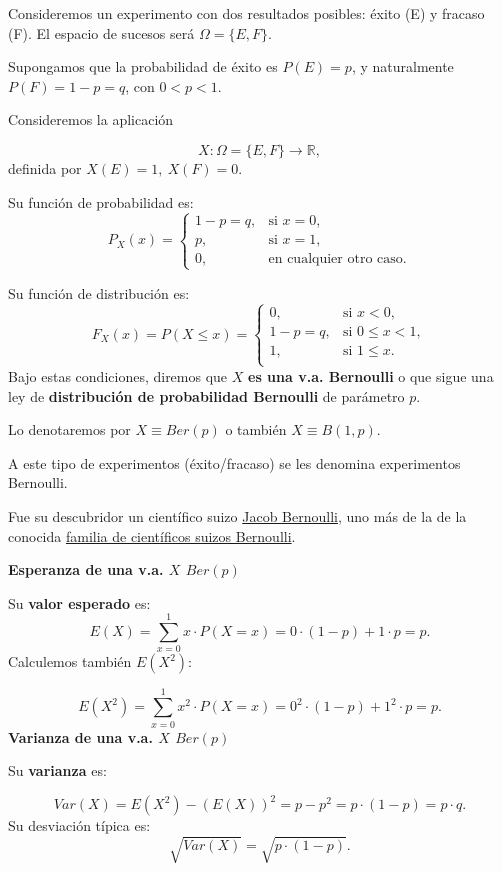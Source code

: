 \documentclass[
  letterpaper,
  DIV=11,
  numbers=noendperiod]{scrreprt}
\begin{document}
Consideremos un experimento con dos resultados posibles: éxito (E) y
fracaso (F). El espacio de sucesos será \(\Omega=\{E,F\}\).

Supongamos que la probabilidad de éxito es \(P(E)=p\), y naturalmente
\(P(F)=1-p=q\), con \(0<p<1\).

Consideremos la aplicación

\[
X:\Omega=\{E,F\}\to \mathbb{R},
\] definida por \(X(E)=1,\ X(F)=0.\)

Su función de probabilidad es: \[
P_{X}(x)=
\left\{
\begin{array}{ll} 1-p=q, & \mbox{si } x=0,\\
p, & \mbox{si } x=1,\\
0, & \mbox{en cualquier otro caso.}
\end{array}
\right.
\]

Su función de distribución es: \[
F_{X}(x)=P(X\leq x)=
\left\{
\begin{array}{ll} 
0, & \mbox{si } x<0,\\
1-p=q, & \mbox{si } 0\leq x <1,\\
1, & \mbox{si } 1\leq x. \\
\end{array}
\right.
\] Bajo estas condiciones, diremos que \(X\) \textbf{es una v.a.
Bernoulli} o que sigue una ley de \textbf{distribución de probabilidad
Bernoulli} de parámetro \(p\).

Lo denotaremos por \(X\equiv Ber(p)\) o también \(X\equiv B(1,p).\)

A este tipo de experimentos (éxito/fracaso) se les denomina experimentos
Bernoulli.

Fue su descubridor un científico suizo
\href{https://es.wikipedia.org/wiki/Jakob_Bernoulli}{Jacob Bernoulli},
uno más de la de la conocida
\href{https://es.wikipedia.org/wiki/Familia_Bernoulli}{familia de
científicos suizos Bernoulli}.

\textbf{Esperanza de una v.a. \(X\) \(Ber(p)\)}

Su \textbf{valor esperado} es:
\[E(X)=\displaystyle\sum_{x=0}^1 x\cdot P(X=x)= 0\cdot(1-p)+1\cdot p=p.\]
Calculemos también \(E(X^2)\):

\[E(X^2)=\displaystyle\sum_{x=0}^1 x^2\cdot P(X=x)= 0^2\cdot(1-p)+1^2\cdot p=p.\]
\textbf{Varianza de una v.a. \(X\) \(Ber(p)\)}

Su \textbf{varianza} es:

\[Var(X)=E(X^2)-\left(E(X)\right)^2=p-p^2=p\cdot (1-p)=p\cdot q.\] Su
desviación típica es: \[
\sqrt{Var(X)}=\sqrt{p \cdot (1-p)}.
\]
\end{document}

